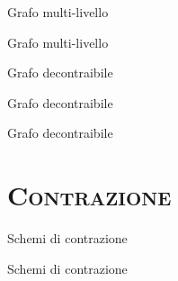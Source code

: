 \documentclass[xcolor=x11names,compress]{beamer}
\begin{document}
\begin{frame}[t]{Grafo multi-livello}
    \vspace{-0.5cm}
    
\end{frame}

\begin{frame}[t]{Grafo multi-livello}
    \vspace{-0.5cm}
    
    
\end{frame}

\begin{frame}[t]{Grafo decontraibile}
    \vspace{-0.5cm}
    
\end{frame}

\begin{frame}[t]{Grafo decontraibile}
    \vspace{-0.5cm}
    
    
\end{frame}

\begin{frame}[t]{Grafo decontraibile}
    \vspace{-0.5cm}
    
    
\end{frame}

\section{\scshape Contrazione}
\begin{frame}[t]{Schemi di contrazione}
    \vspace{-0.5cm}
    
\end{frame}

\begin{frame}[t]{Schemi di contrazione}
    \vspace{-0.5cm}
    
    
\end{frame}
\end{document}
